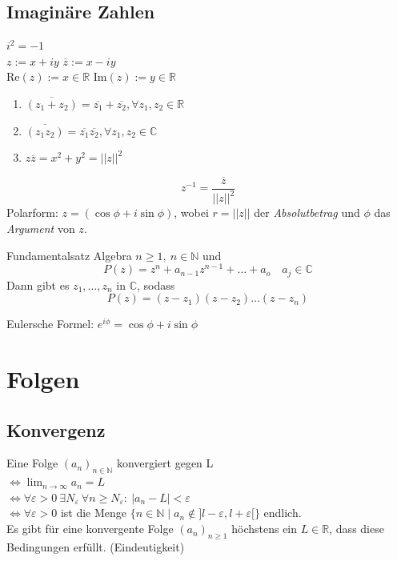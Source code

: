 \documentclass[a4paper,fontsize = 7pt]{scrartcl}
\def\R{\mathbb{R}}
\def\N{\mathbb{N}}
\begin{document}
\subsection{Imaginäre Zahlen}
\begin{center}
  $i^2 = -1$\\
  $z := x + iy$ \qquad $\overline{z} := x - iy$\\
  $\text{Re}(z) := x \in \R$ \qquad  $\text{Im}(z) := y \in \R$
\end{center}
\begin{subbox}{1.24}
  \vspace{-4pt}
    \begin{enumerate}
        \item $\overline{(z_1 + z_2)} = \overline{z_1} + \overline{z_2}, \forall z_1,z_2 \in \R$  
        \item $\overline{(z_1 z_2)} = \overline{z_1} \overline{z_2},  \forall z_1,z_2 \in \mathbb{C}$
        \item $z\overline{z} = x^2 + y^2 = ||z||^2$
    \end{enumerate}
    \vspace{-12pt}
\end{subbox}
\begin{equation*}
    z^{-1} = \frac{\overline{z}}{||z||^2}
\end{equation*}
Polarform: $z = ( \cos \phi + i \sin \phi)$, wobei $r = ||z||$ der \emph{Absolutbetrag} und $\phi$ das \emph{Argument} von $z$.
\begin{mainbox}{Fundamentalsatz Algebra}
  \vspace{-4pt}
    $n \geq 1,~n\in \mathbb{N}$ und 
    \begin{equation*}
        P(z) = z^n + a_{n-1} z^{n-1} + \ldots + a_o \quad a_j \in \mathbb{C}
    \end{equation*}
    Dann gibt es $z_1, ..., z_n$ in $\mathbb{C}$, sodass
    \begin{equation*}
        P(z) = (z - z_1)(z - z_2) \ldots(z-z_n)
    \end{equation*}
    \vspace{-16pt}
\end{mainbox}
Eulersche Formel: $e^{i\phi} = \cos \phi + i \sin \phi$

\section{Folgen}
\subsection{Konvergenz}
Eine Folge $(a_n)_{n\in \mathbb{N}}$ konvergiert gegen L \\ $\iff \lim_{n \to \infty} a_n = L $ 
\\ $\iff \forall \varepsilon > 0 \ \exists N_\varepsilon \ \forall n \ge N_\varepsilon : \ | a_n - L | < \varepsilon$
\\ $\iff \forall \varepsilon > 0 $ ist die Menge $\{n \in \N \mid a_n \notin ]l-\varepsilon,l+\varepsilon[\}$ endlich. 
\\ Es gibt für eine konvergente Folge $(a_n)_{n \geq 1}$ höchstens ein $L \in \R$, dass diese Bedingungen erfüllt. (Eindeutigkeit)
\end{document}
